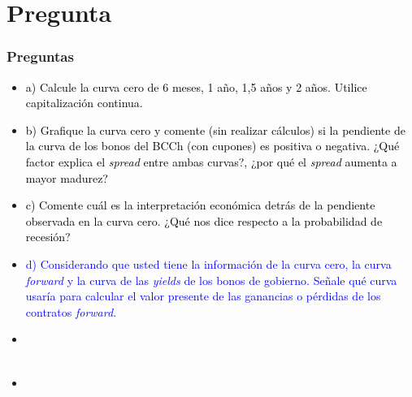 \documentclass{beamer}
\begin{document}
\section{Pregunta }
\begin{frame}
  \frametitle{Preguntas}
  \begin{itemize}
    \scriptsize
    \item {\textcolor{black}{a) Calcule la curva cero de 6 meses, 1 año, 1,5 años y 2 años. Utilice capitalización continua.}}
    \vspace{3pt}
    \item {\textcolor{black}{b) Grafique la curva cero y comente (sin realizar cálculos) si la pendiente de la curva de los bonos del BCCh (con cupones) es positiva o negativa. ¿Qué factor explica el \textit{spread} entre ambas curvas?, ¿por qué el \textit{spread} aumenta a mayor madurez?}}
    \vspace{3pt}
    \item {\textcolor{black}{c) Comente cuál es la interpretación económica detrás de la pendiente observada en la curva cero. ¿Qué nos dice respecto a la probabilidad de recesión?}}
    \vspace{3pt}
    \item {\Large\textcolor{blue}{d) Considerando que usted tiene la información de la curva cero, la curva \textit{forward} y la curva de las \textit{yields} de los bonos de gobierno. Señale qué curva usaría para calcular el valor presente de las ganancias o pérdidas de los contratos \textit{forward}.}}
    \vspace{3pt}
    \item {\textcolor{white}{e) ¿Cuál es el rol de las probabilidades neutrales al riesgo en d)?, ¿qué rol juega la condición de no arbitraje?}}
    \vspace{3pt}
    \item {\textcolor{white}{f) Calcule el punto a) utilizando matrices en Excel/R/Phyton.}}
    \vspace{3pt}
  \end{itemize}
\end{frame}
\end{document}
